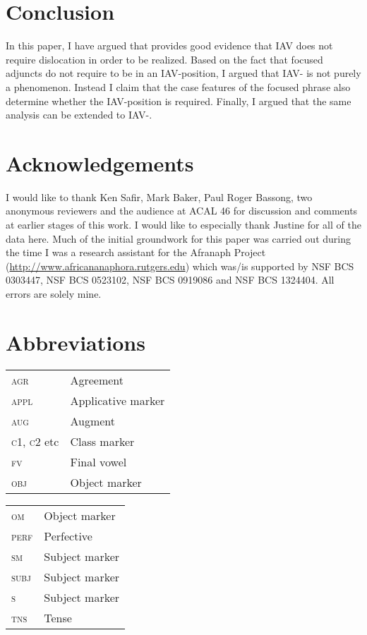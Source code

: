 \documentclass[output=paper,newtxmath,modfonts,nonflat,draft]{langsci/langscibook}
\begin{document}
\section{Conclusion}
In this paper, I have argued that  provides good evidence that IAV  does not require dislocation in order to be realized. Based on the fact that  focused adjuncts do not require to be in an IAV-position, I argued that IAV- is not purely a  phenomenon. Instead I claim that the case features of the focused phrase also determine whether the IAV-position is required. Finally, I argued that the same analysis can be extended to  IAV-.

\section*{Acknowledgements}
I would like to thank Ken Safir, Mark Baker, Paul Roger Bassong, two anonymous reviewers and the audience at ACAL 46 for discussion and comments at earlier stages of this work. I would like to especially thank Justine  for all of the  data here. Much of the initial groundwork for this paper was carried out during the time I was a research assistant for the Afranaph Project (\url{http://www.africananaphora.rutgers.edu}) which was\slash is supported by NSF BCS 0303447, NSF BCS 0523102, NSF BCS 0919086 and NSF BCS 1324404. All errors are solely mine.

\section*{Abbreviations}
\begin{tabularx}{.5\textwidth}{@{}lQ}
\textsc{agr} & Agreement\\
\textsc{appl} & Applicative marker\\
\textsc{aug} & Augment\\
\textsc{c1, c2} etc & Class marker\\
\textsc{fv} & Final vowel\\
\textsc{obj} & Object marker\\
\end{tabularx}%
\begin{tabularx}{.5\textwidth}{lQ@{}}
\textsc{om} & Object marker\\
\textsc{perf} & Perfective\\
\textsc{sm} & Subject marker\\
\textsc{subj} & Subject marker\\
\textsc{s} & Subject marker\\
\textsc{tns} & Tense\\
\end{tabularx}
\end{document}
